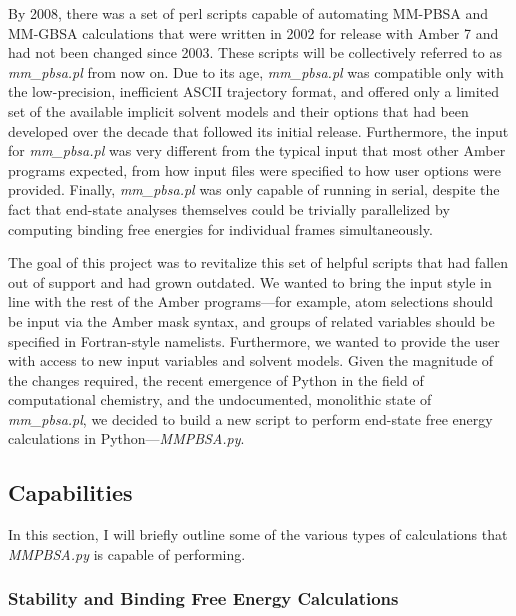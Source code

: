 By 2008, there was a set of perl scripts capable of automating MM-PBSA and
MM-GBSA calculations that were written in 2002 for release with Amber 7 and had
not been changed since 2003. These scripts will be collectively referred to as
\emph{mm\_pbsa.pl} from now on. Due to its age, \emph{mm\_pbsa.pl} was
compatible only with the low-precision, inefficient ASCII trajectory format,
and offered only a limited set of the available implicit solvent models and
their options that had been developed over the decade that followed its initial
release. Furthermore, the input for \emph{mm\_pbsa.pl} was very different from
the typical input that most other Amber programs expected, from how input files
were specified to how user options were provided. Finally, \emph{mm\_pbsa.pl}
was only capable of running in serial, despite the fact that end-state analyses
themselves could be trivially parallelized by computing binding free energies
for individual frames simultaneously.

The goal of this project was to revitalize this set of helpful scripts that had
fallen out of support and had grown outdated. We wanted to bring the input style
in line with the rest of the Amber programs---for example, atom selections
should be input via the Amber mask syntax, and groups of related variables
should be specified in Fortran-style namelists. Furthermore, we wanted to
provide the user with access to new input variables and solvent models. Given
the magnitude of the changes required, the recent emergence of Python in the
field of computational chemistry, \cite{Sanner1999, Cock2009,
Michaud-Agrawal2011, MMPBSApy} and the undocumented, monolithic state of
\emph{mm\_pbsa.pl}, we decided to build a new script to perform end-state free
energy calculations in Python---\emph{MMPBSA.py}. \cite{MMPBSApy}

\subsection{Capabilities}

In this section, I will briefly outline some of the various types of
calculations that \emph{MMPBSA.py} is capable of performing.

\subsubsection{Stability and Binding Free Energy Calculations}

